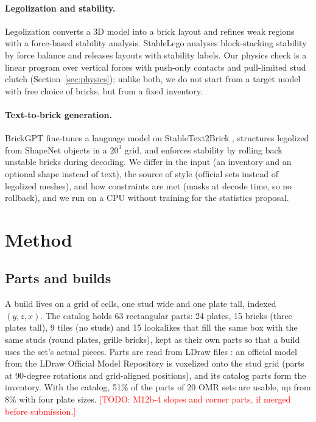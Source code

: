 \documentclass[10pt,twocolumn]{article}
\newcommand{\todo}[1]{\textcolor{red}{[TODO: #1]}}
\begin{document}
\paragraph{Legolization and stability.}
Legolization \cite{luo2015legolization} converts a 3D model into a brick layout and refines weak regions with a
force-based stability analysis. StableLego \cite{liu2024stablelego} analyses block-stacking stability by force
balance and releases layouts with stability labels. Our physics check is a linear program over vertical forces with
push-only contacts and pull-limited stud clutch (Section~\ref{sec:physics}); unlike both, we do not start from a
target model with free choice of bricks, but from a fixed inventory.

\paragraph{Text-to-brick generation.}
BrickGPT \cite{pun2025brickgpt} fine-tunes a language model on StableText2Brick \cite{stabletext2brick}, structures
legolized from ShapeNet \cite{chang2015shapenet} objects in a $20^3$ grid, and enforces stability by rolling back
unstable bricks during decoding.
We differ in the input (an inventory and an optional shape instead of text), the source of style (official sets
instead of legolized meshes), and how constraints are met (masks at decode time, so no rollback), and we run on a
CPU without training for the statistics proposal.

\section{Method}

\subsection{Parts and builds}
A build lives on a grid of cells, one stud wide and one plate tall, indexed $(y,z,x)$. The catalog holds 63
rectangular parts: 24 plates, 15 bricks (three plates tall), 9 tiles (no studs) and 15 lookalikes that fill the same
box with the same studs (round plates, grille bricks), kept as their own parts so that a build uses the set's actual
pieces.
Parts are read from LDraw files \cite{ldraw}: an official model from the LDraw Official Model Repository
\cite{ldrawomr} is voxelized onto the stud grid (parts at 90-degree rotations and grid-aligned positions), and its
catalog parts form the inventory. With the catalog, 51\% of the parts of 20 OMR sets are usable, up from 8\% with
four plate sizes.
\todo{M12b-4 slopes and corner parts, if merged before submission.}
\end{document}
